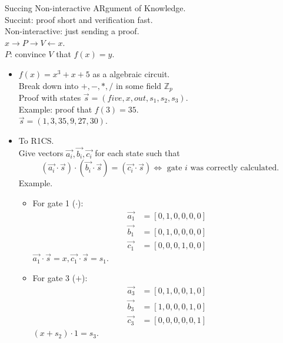 \documentclass[a4paper, 12pt]{book}
\theoremstyle{definition}
\theoremstyle{remark}
\newcommand{\Z}{\mathbb{Z}}
\begin{document}
Succing Non-interactive ARgument of Knowledge. \\
Succint: proof short and verification fast. \\
Non-interactive: just sending a proof. \\
$x \rightarrow P \rightarrow V \leftarrow x$. \\
$P$: convince $V$ that $f(x) = y$.
\begin{itemize}
  \item $f(x) = x^3 + x + 5$ as a algebraic circuit. \\
    Break down into $+, -, *, /$ in some field $\Z_p$ \\
    Proof with states $\overrightarrow{s} = (five, x, out, s_1, s_2, s_3)$. \\
    Example: proof that $f(3) = 35$. \\
    $\overrightarrow{s} = (1, 3, 35, 9, 27, 30)$.
  \item To R1CS. \\
    Give vectors $\overrightarrow{a_i}, \overrightarrow{b_i}, \overrightarrow{c_i}$
    for each state such that
    \begin{equation*}
      (\overrightarrow{a_i} \cdot \overrightarrow{s}) \cdot
      (\overrightarrow{b_i} \cdot \overrightarrow{s}) =
      (\overrightarrow{c_i} \cdot \overrightarrow{s}) \iff \text{ gate $i$ was correctly calculated}.
    \end{equation*}
    Example.
    \begin{itemize}[label={}]
      \item For gate 1 ($\cdot$):
        \begin{align*}
          \overrightarrow{a_1} &= [0, 1, 0, 0, 0, 0] \\
          \overrightarrow{b_1} &= [0, 1, 0, 0, 0, 0] \\
          \overrightarrow{c_1} &= [0, 0, 0, 1, 0, 0]
        \end{align*}
        $\overrightarrow{a_1} \cdot \overrightarrow{s} = x, \overrightarrow{c_1} \cdot \overrightarrow{s} = s_1$.
      \item For gate 3 ($+$):
        \begin{align*}
          \overrightarrow{a_3} &= [0, 1, 0, 0, 1, 0] \\
          \overrightarrow{b_3} &= [1, 0, 0, 0, 1, 0] \\
          \overrightarrow{c_3} &= [0, 0, 0, 0, 0, 1]
        \end{align*}
        $(x + s_2) \cdot 1 = s_3$.

\end{itemize}
\end{itemize}
\end{document}
